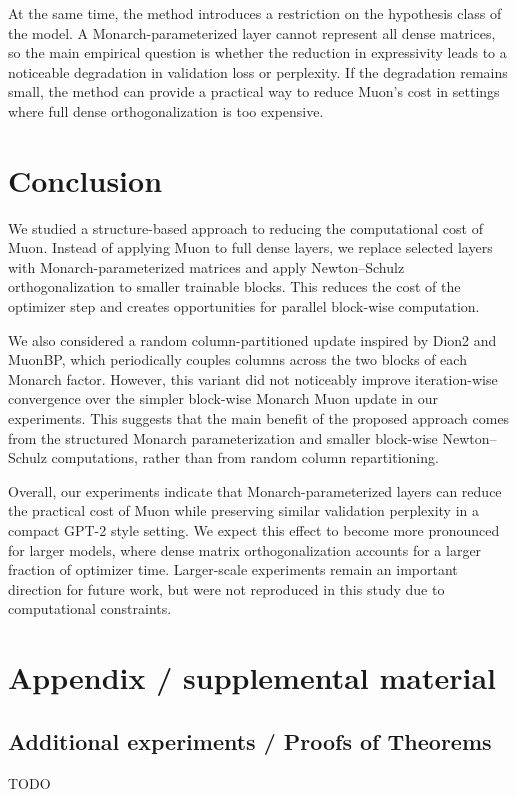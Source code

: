 \documentclass{article}
\begin{document}
At the same time, the method introduces a restriction on the hypothesis class of the model. A Monarch-parameterized layer cannot represent all dense matrices, so the main empirical question is whether the reduction in expressivity leads to a noticeable degradation in validation loss or perplexity. If the degradation remains small, the method can provide a practical way to reduce Muon's cost in settings where full dense orthogonalization is too expensive.

\section{Conclusion}\label{sec:concl}

We studied a structure-based approach to reducing the computational cost of Muon. Instead of applying Muon to full dense layers, we replace selected layers with Monarch-parameterized matrices and apply Newton--Schulz orthogonalization to smaller trainable blocks. This reduces the cost of the optimizer step and creates opportunities for parallel block-wise computation.

We also considered a random column-partitioned update inspired by Dion2 and MuonBP, which periodically couples columns across the two blocks of each Monarch factor. However, this variant did not noticeably improve iteration-wise convergence over the simpler block-wise Monarch Muon update in our experiments. This suggests that the main benefit of the proposed approach comes from the structured Monarch parameterization and smaller block-wise Newton--Schulz computations, rather than from random column repartitioning.

Overall, our experiments indicate that Monarch-parameterized layers can reduce the practical cost of Muon while preserving similar validation perplexity in a compact GPT-2 style setting. We expect this effect to become more pronounced for larger models, where dense matrix orthogonalization accounts for a larger fraction of optimizer time. Larger-scale experiments remain an important direction for future work, but were not reproduced in this study due to computational constraints.




\nocite{*}


\newpage
\appendix
\section{Appendix / supplemental material}\label{app}

\subsection{Additional experiments / Proofs of Theorems}\label{app:exp}

TODO
\end{document}
